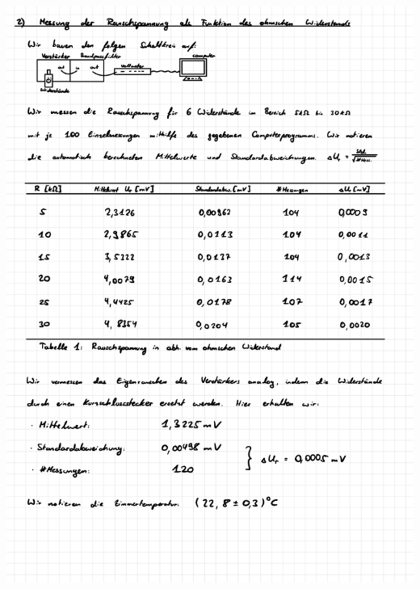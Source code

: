 \documentclass{article}
\begin{document}
\includegraphics[width=\textwidth]{graphics/mess4.jpg}
\newpage
\end{document}
